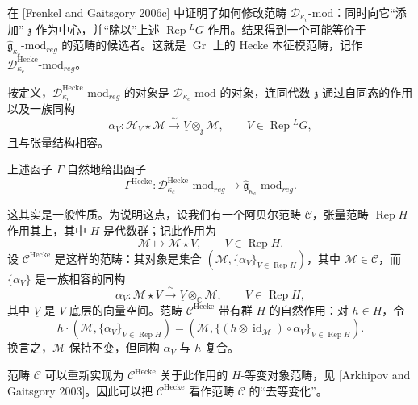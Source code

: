 在 [Frenkel and Gaitsgory 2006c] 中证明了如何修改范畴 $\mathcal{D}_{\kappa_c}\text{-mod}$：同时向它“添加” $\mathfrak{z}$ 作为中心，并“除以”上述 $\operatorname{Rep}{}^LG$-作用。结果得到一个可能等价于 $\hat{\mathfrak{g}}_{\kappa_c}\text{-mod}_{reg}$ 的范畴的候选者。这就是 $\operatorname{Gr}$ 上的 Hecke 本征模范畴，记作 $\mathcal{D}^{\text{Hecke}}_{\kappa_c}\text{-mod}_{reg}$。

按定义，$\mathcal{D}^{\text{Hecke}}_{\kappa_c}\text{-mod}_{reg}$ 的对象是 $\mathcal{D}_{\kappa_c}\text{-mod}$ 的对象，连同代数 $\mathfrak{z}$ 通过自同态的作用以及一族同构
\[
    \alpha_V:\mathcal{H}_V\star\mathcal{M}\xrightarrow{\ \sim\ }
    \underline{V}\otimes_{\mathfrak{z}}\mathcal{M},
    \qquad V\in\operatorname{Rep}{}^LG,
\]
且与张量结构相容。

上述函子 $\Gamma$ 自然地给出函子
\begin{equation}
    \Gamma^{\text{Hecke}}:\mathcal{D}^{\text{Hecke}}_{\kappa_c}\text{-mod}_{reg}
    \to\hat{\mathfrak{g}}_{\kappa_c}\text{-mod}_{reg}.
    \tag{10.3-22}
\end{equation}

这其实是一般性质。为说明这点，设我们有一个阿贝尔范畴 $\mathcal{C}$，张量范畴 $\operatorname{Rep}H$ 作用其上，其中 $H$ 是代数群；记此作用为
\[
    \mathcal{M}\mapsto\mathcal{M}\star V,\qquad V\in\operatorname{Rep}H.
\]
设 $\mathcal{C}^{\text{Hecke}}$ 是这样的范畴：其对象是集合 $(\mathcal{M},\{\alpha_V\}_{V\in\operatorname{Rep}H})$，其中 $\mathcal{M}\in\mathcal{C}$，而 $\{\alpha_V\}$ 是一族相容的同构
\[
    \alpha_V:\mathcal{M}\star V\xrightarrow{\ \sim\ }
    \underline{V}\otimes_{\mathbb{C}}\mathcal{M},
    \qquad V\in\operatorname{Rep}H,
\]
其中 $\underline{V}$ 是 $V$ 底层的向量空间。范畴 $\mathcal{C}^{\text{Hecke}}$ 带有群 $H$ 的自然作用：对 $h\in H$，令
\[
    h\cdot(\mathcal{M},\{\alpha_V\}_{V\in\operatorname{Rep}H})
    =(\mathcal{M},\{(h\otimes\operatorname{id}_{\mathcal{M}})\circ\alpha_V\}_{V\in\operatorname{Rep}H}).
\]
换言之，$\mathcal{M}$ 保持不变，但同构 $\alpha_V$ 与 $h$ 复合。

范畴 $\mathcal{C}$ 可以重新实现为 $\mathcal{C}^{\text{Hecke}}$ 关于此作用的 $H$-等变对象范畴，见 [Arkhipov and Gaitsgory 2003]。因此可以把 $\mathcal{C}^{\text{Hecke}}$ 看作范畴 $\mathcal{C}$ 的“去等变化”。

